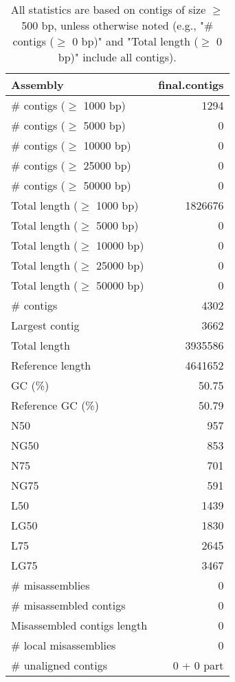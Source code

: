 \documentclass[12pt,a4paper]{article}
\begin{document}
\begin{table}[ht]
\begin{center}
\caption{All statistics are based on contigs of size $\geq$ 500 bp, unless otherwise noted (e.g., "\# contigs ($\geq$ 0 bp)" and "Total length ($\geq$ 0 bp)" include all contigs).}
\begin{tabular}{|l*{1}{|r}|}
\hline
Assembly & final.contigs \\ \hline
\# contigs ($\geq$ 1000 bp) & 1294 \\ \hline
\# contigs ($\geq$ 5000 bp) & 0 \\ \hline
\# contigs ($\geq$ 10000 bp) & 0 \\ \hline
\# contigs ($\geq$ 25000 bp) & 0 \\ \hline
\# contigs ($\geq$ 50000 bp) & 0 \\ \hline
Total length ($\geq$ 1000 bp) & 1826676 \\ \hline
Total length ($\geq$ 5000 bp) & 0 \\ \hline
Total length ($\geq$ 10000 bp) & 0 \\ \hline
Total length ($\geq$ 25000 bp) & 0 \\ \hline
Total length ($\geq$ 50000 bp) & 0 \\ \hline
\# contigs & 4302 \\ \hline
Largest contig & 3662 \\ \hline
Total length & 3935586 \\ \hline
Reference length & 4641652 \\ \hline
GC (\%) & 50.75 \\ \hline
Reference GC (\%) & 50.79 \\ \hline
N50 & 957 \\ \hline
NG50 & 853 \\ \hline
N75 & 701 \\ \hline
NG75 & 591 \\ \hline
L50 & 1439 \\ \hline
LG50 & 1830 \\ \hline
L75 & 2645 \\ \hline
LG75 & 3467 \\ \hline
\# misassemblies & 0 \\ \hline
\# misassembled contigs & 0 \\ \hline
Misassembled contigs length & 0 \\ \hline
\# local misassemblies & 0 \\ \hline
\# unaligned contigs & 0 + 0 part \\ \hline

\end{tabular}
\end{center}
\end{table}
\end{document}
